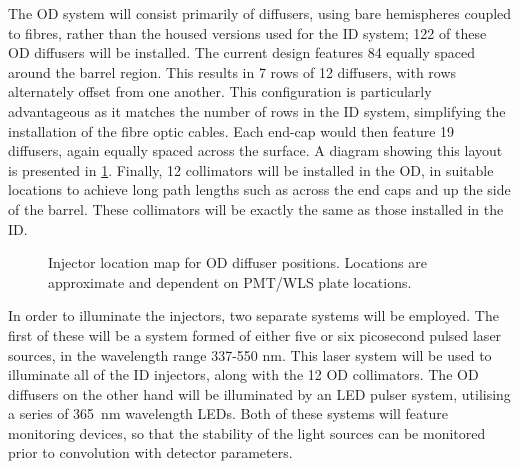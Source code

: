 \documentclass[a4paper,11pt]{article}
\begin{document}
The OD system will consist primarily of diffusers, using bare hemispheres coupled to fibres, rather than the housed versions used for the ID system; 122 of these OD diffusers will be installed. The current design features 84 equally spaced around the barrel region. This results in 7 rows of 12 diffusers, with rows alternately offset from one another. This configuration is particularly advantageous as it matches the number of rows in the ID system, simplifying the installation of the fibre optic cables. Each end-cap would then feature 19 diffusers, again equally spaced across the surface. A diagram showing this layout is presented in \cref{fig:ODdiffmap}. Finally, 12 collimators will be installed in the OD, in suitable locations to achieve long path lengths such as across the end caps and up the side of the barrel. These collimators will be exactly the same as those installed in the ID.

\begin{figure}[h!]
\centering
{}
\caption{Injector location map for OD diffuser positions. Locations are approximate and dependent on PMT/WLS plate locations.}\label{fig:ODdiffmap}
\end{figure}

In order to illuminate the injectors, two separate systems will be employed. The first of these will be a system formed of either five or six picosecond pulsed laser sources, in the wavelength range 337-550 nm. This laser system will be used to illuminate all of the ID injectors, along with the 12 OD collimators. The OD diffusers on the other hand will be illuminated by an LED pulser system, utilising a series of 365~nm wavelength LEDs. Both of these systems will feature monitoring devices, so that the stability of the light sources can be monitored prior to convolution with detector parameters.
\end{document}

